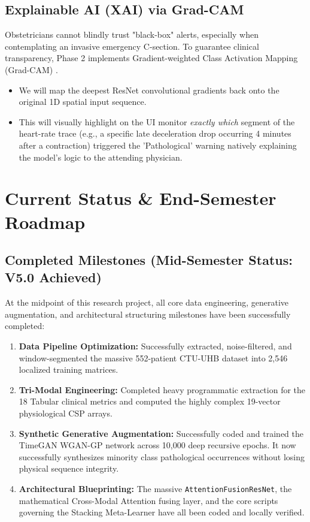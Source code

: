 \documentclass[12pt,a4paper]{report}
\begin{document}
\section{Explainable AI (XAI) via Grad-CAM}
Obstetricians cannot blindly trust "black-box" alerts, especially when contemplating an invasive emergency C-section. To guarantee clinical transparency, Phase 2 implements Gradient-weighted Class Activation Mapping (Grad-CAM) \cite{gradcam1}. 
\begin{itemize}
    \item We will map the deepest ResNet convolutional gradients back onto the original 1D spatial input sequence.
    \item This will visually highlight on the UI monitor \textit{exactly which} segment of the heart-rate trace (e.g., a specific late deceleration drop occurring 4 minutes after a contraction) triggered the 'Pathological' warning natively explaining the model's logic to the attending physician.
\end{itemize}

\chapter{Current Status \& End-Semester Roadmap}
\section{Completed Milestones (Mid-Semester Status: V5.0 Achieved)}
At the midpoint of this research project, all core data engineering, generative augmentation, and architectural structuring milestones have been successfully completed:
\begin{enumerate}
    \item \textbf{Data Pipeline Optimization:} Successfully extracted, noise-filtered, and window-segmented the massive 552-patient CTU-UHB dataset into 2,546 localized training matrices.
    \item \textbf{Tri-Modal Engineering:} Completed heavy programmatic extraction for the 18 Tabular clinical metrics and computed the highly complex 19-vector physiological CSP arrays.
    \item \textbf{Synthetic Generative Augmentation:} Successfully coded and trained the TimeGAN WGAN-GP network across 10,000 deep recursive epochs. It now successfully synthesizes minority class pathological occurrences without losing physical sequence integrity.
    \item \textbf{Architectural Blueprinting:} The massive \texttt{AttentionFusionResNet}, the mathematical Cross-Modal Attention fusing layer, and the core scripts governing the Stacking Meta-Learner have all been coded and locally verified.
\end{enumerate}
\end{document}

